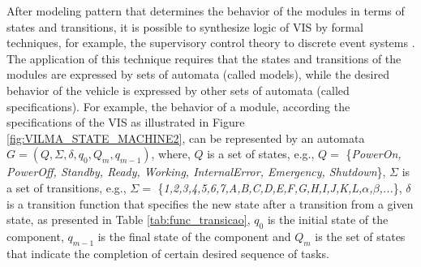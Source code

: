 \documentclass[conference]{IEEEtran}
\begin{document}
After modeling pattern that determines the behavior of the modules in terms of states and transitions, it is possible to synthesize logic of VIS by formal techniques, for example, the supervisory control theory to discrete event systems \cite{event_systems}. The application of this technique requires that the states and transitions of the modules are expressed by sets of automata (called models), while the desired behavior of the vehicle is expressed by other sets of automata (called specifications). For example, the behavior of a module, according the specifications of the VIS as illustrated in Figure \ref{fig:VILMA_STATE_MACHINE2}, can be represented by an automata $G = (Q,\Sigma,\delta,q_{0},Q_{m},q_{m-1})$, where, $Q$ is a set of states, e.g., $Q =$ \{\textit{PowerOn, PowerOff, Standby, Ready, Working, InternalError, Emergency, Shutdown}\}, $\Sigma$ is a set of transitions, e.g., $\Sigma =$ \{\textit{1,2,3,4,5,6,7,A,B,C,D,E,F,G,H,I,J,K,L,$\alpha$,$\beta$,...}\}, $\delta$ is a transition function that specifies the new state after a transition from a given state, as presented in Table \ref{tab:func_transicao}, $q_{0}$ is the initial state of the component, $q_{m-1}$ is the final state of the component and $Q_{m}$ is the set of states that indicate the completion of certain desired sequence of tasks.
\end{document}
